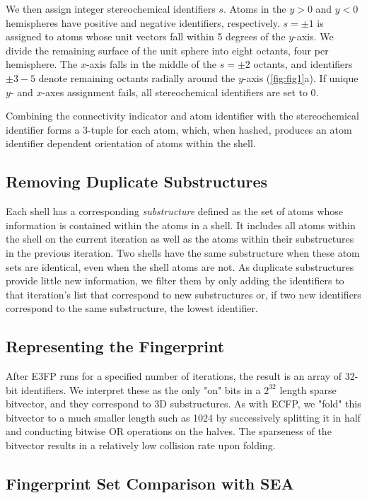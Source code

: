 \documentclass[../main.tex]{subfiles}
\begin{document}
\begin{refsection}
We then assign integer stereochemical identifiers $s$.
Atoms in the  $y > 0$ and $y < 0$ hemispheres have positive and negative identifiers, respectively.
$s = \pm 1$ is assigned to atoms whose unit vectors fall within 5 degrees of the $y$-axis.
We divide the remaining surface of the unit sphere into eight octants, four per hemisphere.
The $x$-axis falls in the middle of the  $s = \pm 2$ octants, and identifiers $\pm 3-5$ denote remaining octants radially around the $y$-axis (\cref{fig:fig1}a).
If unique $y$- and  $x$-axes assignment fails, all stereochemical identifiers are set to 0.

Combining the connectivity indicator and atom identifier with the stereochemical identifier forms a 3-tuple for each atom, which, when hashed, produces an atom identifier dependent orientation of atoms within the shell.

\subsection*{Removing Duplicate Substructures}

Each shell has a corresponding \emph{substructure} defined as the set of atoms whose information is contained within the atoms in a shell.
It includes all atoms within the shell on the current iteration as well as the atoms within their substructures in the previous iteration.
Two shells have the same substructure when these atom sets are identical, even when the shell atoms are not.
As duplicate substructures provide little new information, we filter them by only adding the identifiers to that iteration's list that correspond to new substructures or, if two new identifiers correspond to the same substructure, the lowest identifier.

\subsection*{Representing the Fingerprint}

After E3FP runs for a specified number of iterations, the result is an array of 32-bit identifiers.
We interpret these as the only "on" bits in a $2^{32}$ length sparse bitvector, and they correspond to 3D substructures.
As with ECFP, we "fold" this bitvector to a much smaller length such as 1024 by successively splitting it in half and conducting bitwise OR operations on the halves.
The sparseness of the bitvector results in a relatively low collision rate upon folding.

\subsection*{Fingerprint Set Comparison with SEA}


\end{refsection}
\end{document}
